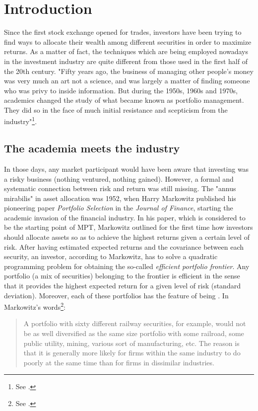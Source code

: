 \chapter{Introduction}

Since the first stock exchange opened for trades, investors have been trying to find ways to allocate their wealth among different securities in order to maximize returns. As a matter of fact, the techniques which are being employed nowadays in the investment industry are quite different from those used in the first half of the 20th century. "Fifty years ago, the business of managing other people's money was very much an art not a science, and was largely a matter of finding someone who was privy to inside information. But during the 1950s, 1960s and 1970s, academics changed the study of what became known as portfolio management. They did so in the face of much initial resistance and scepticism from the industry"\footnote{See \cite{Econ}.}. 

\section{The academia meets the industry}
In those days, any market participant would have been aware that investing was a risky business (nothing ventured, nothing gained). However, a formal and systematic connection between risk and return was still missing. The "annus mirabilis" in asset allocation was 1952, when Harry Markowitz published his pioneering paper \textit{Portfolio Selection} in the \textit{Journal of Finance}, starting the academic invasion of the financial industry. In his paper, which is considered to be the starting point of \gls{MPT}, Markowitz outlined for the first time how investors should allocate assets so as to achieve the highest returns given a certain level of risk. After having estimated expected returns and the covariance between each security, an investor, according to Markowitz, has to solve a quadratic programming problem for obtaining the so-called \textit{efficient portfolio frontier}. Any portfolio (a mix of securities) belonging to the frontier is efficient in the sense that it provides the highest expected return for a given level of risk (standard deviation). Moreover, each of these portfolios has the feature of being . In Markowitz's words\footnote{See \cite{bernstein2012}.}:
\begin{quote}
	A portfolio with sixty different railway securities, for example, would not be as well diversified as the same size portfolio with some railroad, some public utility, mining, various sort of manufacturing, etc. The reason is that it is generally more likely for firms within the same industry to do poorly at the same time than for firms in dissimilar industries. 
\end{quote}

